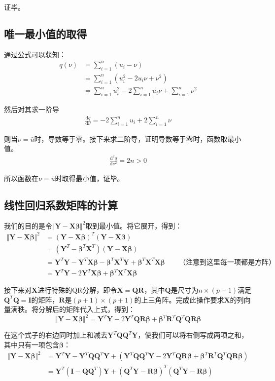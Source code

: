 \documentclass{MGLSA-cn-book-math}
\begin{document}
证毕。

\subsection{唯一最小值的取得}
\label{proof:LSE-lemma-minvalue-avg}
通过公式可以获知：
\begin{align*}
	q(\nu)&=\sum_{i=1}^n(u_i-\nu)\\
	&=\sum_{i=1}^n(u_i^2-2u_i\nu+\nu^2)\\
	&=\sum_{i=1}^nu_i^2-2\sum_{i=1}^nu_i\nu+\sum_{i=1}^n\nu^2
\end{align*}

然后对其求一阶导
\begin{align*}
	\frac{\mathrm dq}{\mathrm d\nu}=-2\sum_{i=1}^nu_i+2\sum_{i=1}^n\nu
\end{align*}

则当$\nu=\bar u$时，导数等于零。接下来求二阶导，证明导数等于零时，函数取最小值。
\begin{align*}
	\frac{\mathrm d^2q}{\mathrm d\nu^2}=2n>0
\end{align*}

所以函数在$\nu=\bar u$时取得最小值，证毕。
\subsection{线性回归系数矩阵的计算}
\label{proof:LSE-matrix-calc}
我们的目的是令$\Vert\bm{Y}-\bm{X\beta}\Vert^2$取到最小值。将它展开，得到：
\begin{align*}
	\Vert\bm{Y}-\bm{X\beta}\Vert^2&=(\bm{Y}-\bm{X\beta})^T(\bm{Y}-\bm{X\beta}) \\
	&=(\bm{Y}^T-\bm{\beta}^T\bm{X}^T)(\bm{Y}-\bm{X\beta}) \\
	&=\bm{Y}^T\bm{Y}-\bm{Y}^T\bm{X\beta}-\bm{\beta}^T\bm{X}^T\bm{Y}+\bm{\beta}^T\bm{X}^T\bm{X\beta}\qquad \text{（注意到这里每一项都是方阵）} \\
	&=\bm{Y}^T\bm{Y}-2\bm{Y}^T\bm{X\beta}+\bm{\beta}^T\bm{X}^T\bm{X\beta}
\end{align*}

接下来对$\bm{X}$进行特殊的QR分解，即令$\bm{X}=\bm{QR}$，其中$\bm{Q}$是尺寸为$n\times(p+1)$满足$\bm{Q}^T\bm{Q}=\bm{I}$的矩阵，$\bm{R}$是$(p+1)\times(p+1)$的上三角阵。完成此操作要求$\bm{X}$的列向量满秩。将分解后的矩阵代入上式，得到：
\[
	\Vert\bm{Y}-\bm{X\beta}\Vert^2=\bm{Y}^T\bm{Y}-2\bm{Y}^T\bm{QR\beta}+\bm{\beta}^T\bm{R}^T\bm{Q}^T\bm{QR\beta}
\]

在这个式子的右边同时加上和减去$\bm{Y}^T\bm{QQ}^T\bm{Y}$，使我们可以将右侧写成两项之和，其中只有一项包含$\bm{\beta}$：
\begin{align*}
	\Vert\bm{Y}-\bm{X\beta}\Vert^2&=\bm{Y}^T\bm{Y}-\bm{Y}^T\bm{QQ}^T\bm{Y}+(\bm{Y}^T\bm{QQ}^T\bm{Y}-2\bm{Y}^T\bm{QR\beta}+\bm{\beta}^T\bm{R}^T\bm{Q}^T\bm{QR\beta}) \\
	&=\bm{Y}^T(\bm{I}-\bm{QQ}^T)\bm{Y}+(\bm{Q}^T\bm{Y}-\bm{R\beta})^T(\bm{Q}^T\bm{Y}-\bm{R\beta})
\end{align*}
\end{document}
